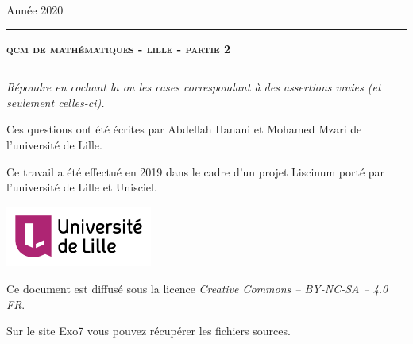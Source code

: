 \documentclass[12pt,a4paper]{article}
\begin{document}
 
 


\hfill{Ann\'ee 2020}

\vspace*{0.5ex}
\hrule\vspace*{1.5ex} 
\hfil\textsc{\textbf{\LARGE qcm de mathématiques - lille - partie 2}}
\vspace*{1.2ex} \hrule 
\vspace*{5ex} 


\vspace{4cm}

\begin{center}
\begin{minipage}{0.8\textwidth}
\center
\textit{Répondre en cochant la ou les cases correspondant à des assertions vraies (et seulement celles-ci).}
\end{minipage}
\end{center}
  
  


\vfill

\begin{center}
\begin{minipage}{0.8\textwidth}
\center
Ces questions ont été écrites par Abdellah Hanani et Mohamed Mzari de l'université de Lille.
  
  \medskip
  
Ce travail a été effectué en 2019 dans le cadre d'un projet Liscinum porté par l'université de Lille et Unisciel.
\end{minipage}

  \medskip

\qquad\qquad
\includegraphics[height=2cm]{ulnom_300}

  \medskip
  
Ce document est diffusé sous la licence \emph{Creative Commons -- BY-NC-SA -- 4.0 FR}.


Sur le site Exo7 vous pouvez récupérer les fichiers sources.

\end{center}
\end{document}

